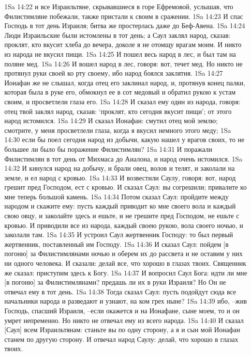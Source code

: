 1Sa 14:22  и все Израильтяне, скрывавшиеся в горе Ефремовой, услышав, что Филистимляне побежали, также пристали к своим в сражении.
1Sa 14:23  И спас Господь в тот день Израиля; битва же простерлась даже до Беф-Авена.
1Sa 14:24  Люди Израильские были истомлены в тот день; а Саул заклял народ, сказав: проклят, кто вкусит хлеба до вечера, доколе я не отомщу врагам моим. И никто из народа не вкусил пищи.
1Sa 14:25  И пошел весь народ в лес, и был там на поляне мед.
1Sa 14:26  И вошел народ в лес, говоря: вот, течет мед. Но никто не протянул руки своей ко рту своему, ибо народ боялся заклятия.
1Sa 14:27  Ионафан же не слышал, когда отец его заклинал народ, и, протянув конец палки, которая была в руке его, обмокнул ее в сот медовый и обратил рукою к устам своим, и просветлели глаза его.
1Sa 14:28  И сказал ему один из народа, говоря: отец твой заклял народ, сказав: `проклят, кто сегодня вкусит пищи'; от этого народ истомился.
1Sa 14:29  И сказал Ионафан: смутил отец мой землю; смотрите, у меня просветлели глаза, когда я вкусил немного этого меду;
1Sa 14:30  если бы поел сегодня народ из добычи, какую нашел у врагов своих, то не большее ли было бы поражение Филистимлян?
1Sa 14:31  И поражали Филистимлян в тот день от Михмаса до Аиалона, и народ очень истомился.
1Sa 14:32  И кинулся народ на добычу, и брали овец, волов и телят, и заколали на земле, и ел народ с кровью.
1Sa 14:33  И возвестили Саулу, говоря: вот, народ грешит пред Господом, ест с кровью. И сказал Саул: вы согрешили; привалите ко мне теперь большой камень.
1Sa 14:34  Потом сказал Саул: пройдите между народом и скажите ему: пусть каждый приводит ко мне своего вола и каждый свою овцу, и заколайте здесь и ешьте, и не грешите пред Господом, не ешьте с кровью. И приводили все из народа, каждый своею рукою, вола своего ночью, и заколали там.
1Sa 14:35  И устроил Саул жертвенник Господу: то был первый жертвенник, поставленный им Господу.
1Sa 14:36  И сказал Саул: пойдем [в погоню] за Филистимлянами ночью и оберем их до рассвета и не оставим у них ни одного человека. И сказали: делай все, что хорошо в глазах твоих. Священник же сказал: приступим здесь к Богу.
1Sa 14:37  И вопросил Саул Бога: идти ли мне [в погоню] за Филистимлянами? предашь ли их в руки Израиля? Но Он не отвечал ему в тот день.
1Sa 14:38  Тогда сказал Саул: пусть подойдут сюда все начальники народа и разведают и узнают, на ком грех ныне?
1Sa 14:39  ибо, --жив Господь, спасший Израиля, --если окажется и на Ионафане, сыне моем, то и он умрет непременно. Но никто не отвечал ему из всего народа.
1Sa 14:40  И сказал [Саул] всем Израильтянам: станьте вы по одну сторону, а я и сын мой Ионафан станем по другую сторону. И отвечал народ Саулу: делай, что хорошо в глазах твоих.
